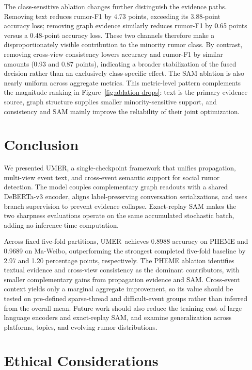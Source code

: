 \documentclass[sigconf,anonymous,review]{../acmart/acmart}
\newcommand{\method}{\textsc{UMER}}
\begin{document}
The class-sensitive ablation changes further distinguish the evidence paths.
Removing text reduces rumor-F1 by 4.73 points, exceeding its 3.88-point
accuracy loss; removing graph evidence similarly reduces rumor-F1 by 0.65
points versus a 0.48-point accuracy loss.  These two channels therefore make a
disproportionately visible contribution to the minority rumor class.  By
contrast, removing cross-view consistency lowers accuracy and rumor-F1 by
similar amounts (0.93 and 0.87 points), indicating a broader stabilization of
the fused decision rather than an exclusively class-specific effect.  The SAM
ablation is also nearly uniform across aggregate metrics.  This metric-level
pattern complements the magnitude ranking in Figure~\ref{fig:ablation-drops}:
text is the primary evidence source, graph structure supplies smaller
minority-sensitive support, and consistency and SAM mainly improve the
reliability of their joint optimization.

\FloatBarrier
\section{Conclusion}
\label{sec:conclusion}

We presented \method, a single-checkpoint framework that unifies propagation,
multi-view event text, and cross-event semantic support for social rumor
detection.  The model couples complementary graph readouts with a shared
DeBERTa-v3 encoder, aligns label-preserving conversation serializations, and
uses branch supervision to prevent evidence collapse.  Exact-replay SAM makes
the two sharpness evaluations operate on the same accumulated stochastic
batch, adding no inference-time computation.

Across fixed five-fold partitions, \method\ achieves 0.8988 accuracy on PHEME
and 0.9689 on Ma-Weibo, outperforming the strongest completed five-fold
baseline by 2.97 and 1.20 percentage points, respectively.  The PHEME ablation
identifies textual evidence and cross-view consistency as the dominant
contributors, with smaller complementary gains from propagation evidence and
SAM.  Cross-event context yields only a marginal aggregate improvement, so its
value should be tested on pre-defined sparse-thread and difficult-event groups
rather than inferred from the overall mean.  Future work should also reduce
the training cost of large language encoders and exact-replay SAM, and examine
generalization across platforms, topics, and evolving rumor distributions.

\section{Ethical Considerations}
\end{document}
